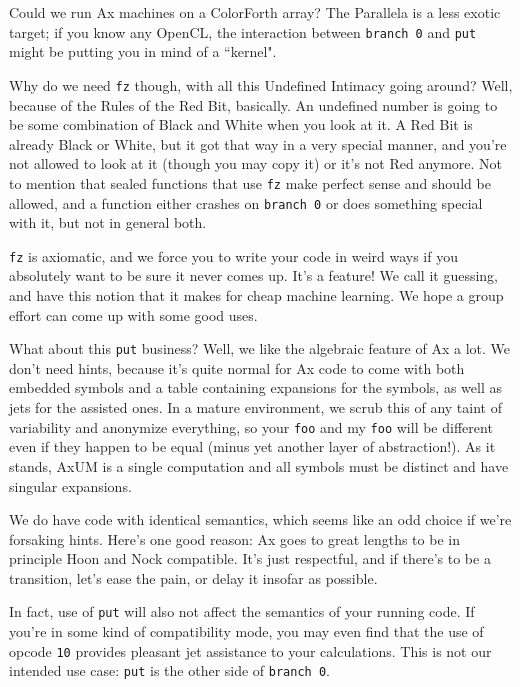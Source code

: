 \documentclass[twoside]{article}
\begin{document}
Could we run Ax machines on a ColorForth array? %
The Parallela is a less exotic target; if you know any OpenCL, the interaction between \texttt{branch 0} and \texttt{put} might be putting you in mind of a ``kernel". %

Why do we need \texttt{fz} though, with all this Undefined Intimacy going around? Well, because of the Rules of the Red Bit, basically. An undefined number is going to be some combination of Black and White when you look at it. A Red Bit is already Black or White, but it got that way in a very special manner, and you're not allowed to look at it (though you may copy it) or it's not Red anymore. Not to mention that sealed functions that use \texttt{fz} make perfect sense and should be allowed, and a function either crashes on \texttt{branch 0} or does something special with it, but not in general both. 

\texttt{fz} is axiomatic, and we force you to write your code in weird ways if you absolutely want to be sure it never comes up. It's a feature! We call it guessing, and have this notion that it makes for cheap machine learning. We hope a group effort can come up with some good uses. 

What about this \texttt{put} business? Well, we like the algebraic feature of Ax a lot. We don't need hints, because it's quite normal for Ax code to come with both embedded symbols and a table containing expansions for the symbols, as well as jets for the assisted ones. In a mature environment, we scrub this of any taint of variability and anonymize everything, so your \texttt{foo} and my \texttt{foo} will be different even if they happen to be equal (minus yet another layer of abstraction!). As it stands, AxUM is a single computation and all symbols must be distinct and have singular expansions.

We do have code with identical semantics, which seems like an odd choice if we're forsaking hints. Here's one good reason: Ax goes to great lengths to be in principle Hoon and Nock compatible. It's just respectful, and if there's to be a transition, let's ease the pain, or delay it insofar as possible.

In fact, use of \texttt{put} will also not affect the semantics of your running code. If you're in some kind of compatibility mode, you may even find that the use of opcode \texttt{10} provides pleasant jet assistance to your calculations. This is not our intended use case: \texttt{put} is the other side of \texttt{branch 0}.
\end{document}
